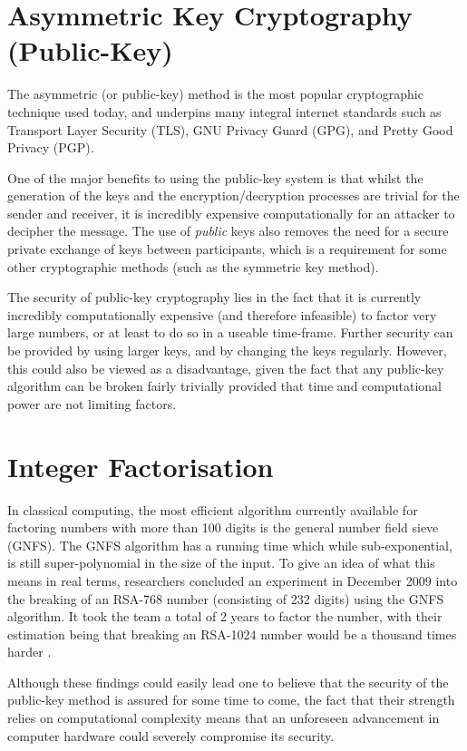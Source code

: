 \documentclass[runningheads,a4paper]{llncs}
\begin{document}
\section{Asymmetric Key Cryptography (Public-Key)} 

The asymmetric (or public-key) method is the most popular cryptographic technique used today, and underpins many integral internet standards such as Transport Layer Security (TLS), GNU Privacy Guard (GPG), and Pretty Good Privacy (PGP).

One of the major benefits to using the public-key system is that whilst the generation of the keys and the encryption/decryption processes are trivial for the sender and receiver, it is incredibly expensive computationally for an attacker to decipher the message. The use of \emph{public} keys also removes the need for a secure private exchange of keys between participants, which is a requirement for some other cryptographic methods (such as the symmetric key method).

The security of public-key cryptography lies in the fact that it is currently incredibly computationally expensive (and therefore infeasible) to factor very large numbers, or at least to do so in a useable time-frame. Further security can be provided by using larger keys, and by changing the keys regularly. However, this could also be viewed as a disadvantage, given the fact that any public-key algorithm can be broken fairly trivially provided that time and computational power are not limiting factors.

\section{Integer Factorisation}

In classical computing, the most efficient algorithm currently available for factoring numbers with more than 100 digits is the general number field sieve (GNFS). The GNFS algorithm has a running time which while sub-exponential, is still super-polynomial in the size of the input. To give an idea of what this means in real terms, researchers concluded an experiment in December 2009 into the breaking of an RSA-768 number (consisting of 232 digits) using the GNFS algorithm. It took the team a total of 2 years to factor the number, with their estimation being that breaking an RSA-1024 number would be a thousand times harder \cite{Kleinjung:2010:FRM:1881412.1881436}. 

Although these findings could easily lead one to believe that the security of the public-key method is assured for some time to come, the fact that their strength relies on computational complexity means that an unforeseen advancement in  computer hardware could severely compromise its security. 
\end{document}
